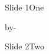 \documentclass{beamer}
\begin{document}
\begin{frame}{Slide 1}One\end{frame}
\setlength{\headheight}{.5ex}

\makeatletter
    \advance\textheight by-\headheight%
  \@colht\textheight%
  \@colroom\textheight%
  \vsize\textheight%
\makeatother


\begin{frame}{Slide 2}Two\end{frame}
\end{document}

